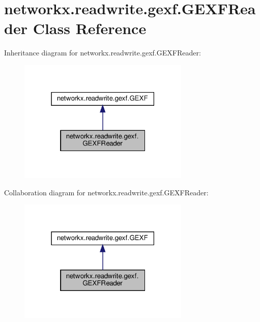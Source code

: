 \hypertarget{classnetworkx_1_1readwrite_1_1gexf_1_1GEXFReader}{}\section{networkx.\+readwrite.\+gexf.\+G\+E\+X\+F\+Reader Class Reference}
\label{classnetworkx_1_1readwrite_1_1gexf_1_1GEXFReader}


Inheritance diagram for networkx.\+readwrite.\+gexf.\+G\+E\+X\+F\+Reader\+:
\nopagebreak
\begin{figure}[H]
\begin{center}
\leavevmode
\includegraphics[width=231pt]{classnetworkx_1_1readwrite_1_1gexf_1_1GEXFReader__inherit__graph}
\end{center}
\end{figure}


Collaboration diagram for networkx.\+readwrite.\+gexf.\+G\+E\+X\+F\+Reader\+:
\nopagebreak
\begin{figure}[H]
\begin{center}
\leavevmode
\includegraphics[width=231pt]{classnetworkx_1_1readwrite_1_1gexf_1_1GEXFReader__coll__graph}
\end{center}
\end{figure}
